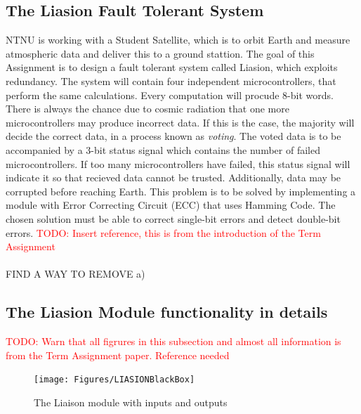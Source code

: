 \documentclass[a4paper]{IEEEtran}
\newcommand\TODO[1]{\textcolor{red}{TODO:#1}}
\newcommand\todo[1]{\TODO{#1}}
\begin{document}
\subsection{The Liasion Fault Tolerant System}
NTNU is working with a Student Satellite, which is to orbit Earth and measure atmospheric data and deliver this to a ground stattion. The goal of this Assignment is to design a fault tolerant system called Liasion, which exploits redundancy. The system will contain four independent microcontrollers, that perform the same calculations. Every computation will procude 8-bit words. There is always the chance due to cosmic radiation that one more microcontrollers may produce incorrect data. If this is the case, the majority will decide the correct data, in a process known as \textit{voting}. The voted data is to be accompanied by a 3-bit status signal which contains the number of failed microcontrollers. If too many microcontrollers have failed, this status signal will indicate it so that recieved data cannot be trusted. Additionally, data may be corrupted before reaching Earth. This problem is to be solved by implementing a module with Error Correcting Circuit (ECC) that uses Hamming Code. The chosen solution must be able to correct single-bit errors and detect double-bit errors.
\break 
\todo{ Insert reference, this is from the introduction of the Term Assignment}
\paragraph{}
FIND A WAY TO REMOVE a)


\subsection{The Liasion Module functionality in details}

\todo{ Warn that all figrures in this subsection and almost all information is from the Term Assignment paper. Reference needed}

\begin{figure}[h!]
  \centering
      \texttt{[image: Figures/LIASIONBlackBox]}
  \caption{The Liaison module with inputs and outputs}
  \label{fig:LiasionBlackBox}
\end{figure}
\end{document}
